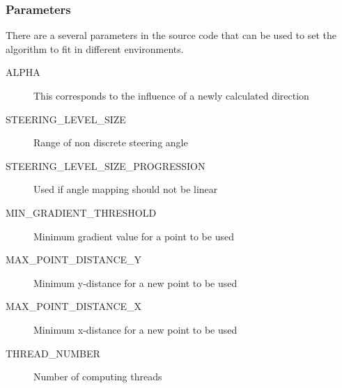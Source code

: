 \subsubsection{Parameters}
There are a several parameters in the source code that can be used to set the algorithm to fit in different environments.
\begin{description}
	\item [\small ALPHA] This corresponds to the influence of a newly calculated direction
	\newpage
	\item [\small STEERING\_LEVEL\_SIZE] Range of non discrete steering angle
	\item [\small STEERING\_LEVEL\_SIZE\_PROGRESSION] Used if angle mapping should not be linear
	\item [\small MIN\_GRADIENT\_THRESHOLD] Minimum gradient value for a point to be used
	\item [\small MAX\_POINT\_DISTANCE\_Y] Minimum y-distance for a new point to be used
	\item [\small MAX\_POINT\_DISTANCE\_X] Minimum x-distance for a new point to be used
	\item [\small THREAD\_NUMBER] Number of computing threads
\end{description}